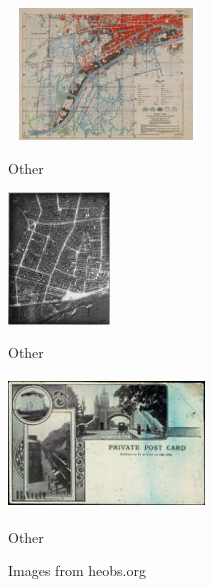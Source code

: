 \documentclass[hidelinks,12pt,a4paper]{report}
\begin{document}
\begin{figure}[!htb]
  \includegraphics[width=5.2cm, height=3.5cm, left]{images/sample/other_129}
  \captionsetup{labelformat=empty}
  \caption{Other}
\endminipage\hfill
{}
  \includegraphics[height=3.5cm, center]{images/sample/other_190}
  \captionsetup{labelformat=empty}
  \caption{Other}
\endminipage\hfill
{}%
  \includegraphics[width=5.2cm, height=3.5cm, right]{images/sample/other_202}
  \captionsetup{labelformat=empty}
  \caption{Other}
\endminipage
  \caption{Images from heobs.org}
\end{figure}



\end{document}
